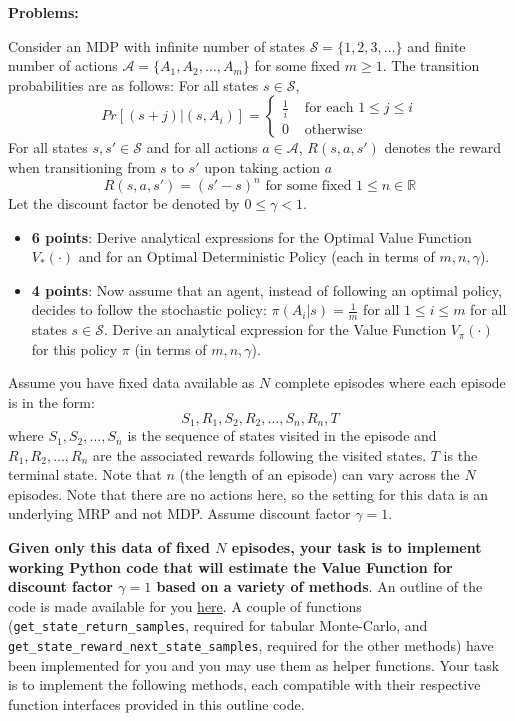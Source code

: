 \documentclass[12pt]{exam}
\begin{document}
{\large{\bf Problems:}}
\begin{questions}

\question Consider an MDP with infinite number of states $\mathcal{S} = \{1,2,3, \ldots \}$ and finite number of actions $\mathcal{A} = \{A_1, A_2, \ldots, A_m\}$ for some fixed $m\geq 1$. The transition probabilities are as follows:
For all states $s \in \mathcal{S}$,
$$
Pr[(s+j)|(s,A_i)] =
\begin{cases}
\frac 1 i & \text{ for each } 1\leq j \leq i\\
0 & \text{ otherwise}
\end{cases}
$$
For all states $s, s' \in \mathcal{S}$ and for all actions $a \in \mathcal{A}$, $R(s,a,s')$ denotes the reward when transitioning from $s$ to $s'$ upon taking action $a$
$$R(s,a,s') = (s'-s)^n \text{ for some fixed } 1 \leq n \in \mathbb{R}$$
Let the discount factor be denoted by $0 \leq \gamma < 1$.
\begin{itemize}
\item {\bf 6 points}: Derive analytical expressions for the Optimal Value Function $V_*(\cdot)$ and for an Optimal Deterministic Policy (each in terms of $m, n, \gamma$).
\item {\bf 4 points}: Now assume that an agent, instead of following an optimal policy, decides to follow the stochastic policy: $\pi(A_i|s) = \frac 1 m$ for all $1 \leq i \leq m$ for all states $s \in \mathcal{S}$. Derive an analytical expression for the Value Function $V_{\pi}(\cdot)$ for this policy $\pi$ (in terms of $m, n, \gamma$).
\end{itemize}

\pagebreak


\question Assume you have fixed data available as $N$ complete episodes where each episode is in the form:
$$S_1,R_1,S_2,R_2,\ldots, S_n,R_n, T$$
where $S_1,S_2,\ldots,S_n$ is the sequence of states visited in the episode and $R_1,R_2,\ldots,R_n$ are the associated rewards following the visited states. $T$ is the terminal state. Note that $n$ (the length of an episode) can vary across the $N$ episodes. Note that there are no actions here, so the setting for this data is an underlying MRP and not MDP. Assume discount factor $\gamma = 1$.

{\bf Given only this data of fixed $N$ episodes, your task is to implement working Python code that will estimate the Value Function for discount factor $\gamma = 1$ based on a variety of methods}. An outline of the code is made available for you \href{https://github.com/coverdrive/MDP-DP-RL/blob/master/src/examples/exam_problems/mrp_tdmc_outline.py}{here}. A couple of functions (\lstinline{get_state_return_samples}, required for tabular Monte-Carlo, and \lstinline{get_state_reward_next_state_samples}, required for the other methods) have been implemented for you and you may use them as helper functions. Your task is to implement the following methods, each compatible with their respective function interfaces provided in this outline code. 


\end{questions}
\end{document}
